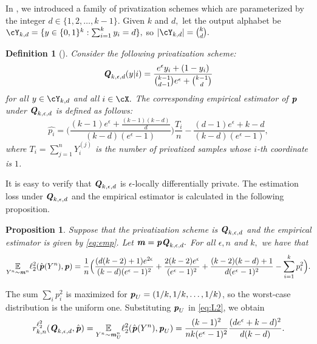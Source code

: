 \documentclass[11pt,onecolumn]{IEEEtran}
\newtheorem{proposition}[theorem]{Proposition}
\newtheorem{definition}[theorem]{Definition}
\def\mathbi#1{{\textbf{\textit #1}}}
\begin{document}
In \cite{Ye17}, we introduced a family of privatization schemes
which are parameterized by the integer $d\in\{1,2,\dots,k-1\}.$ Given $k$ and $d,$ let the output alphabet be 
$\cY_{k,d}=\{y\in \{0,1\}^k: \sum_{i=1}^k y_i=d\},$ so $|\cY_{k,d}|=\binom{k}{d}.$ 

\begin{definition} [\cite{Ye17}] Consider the following privatization scheme:
   \begin{equation}\label{eq:defQ}
\mathbi{Q}_{k,\epsilon,d}(y|i)=\frac{e^\epsilon y_i+(1-y_i)}{\binom{k-1}{d-1}e^{\epsilon}+\binom{k-1}{d}} 
    \end{equation}
for all $y\in\cY_{k,d}$ and all $i\in\cX.$
%
The corresponding empirical estimator of $\mathbi{p}$ under $\mathbi{Q}_{k,\epsilon,d}$ is defined as follows:
\begin{equation}\label{eq:emp}
\hat{p_i}=\Big(\frac{(k-1)e^{\epsilon}+\frac{(k-1)(k-d)}{d}}{(k-d)(e^{\epsilon}-1)}\Big)\frac{T_i}{n}
-\frac{(d-1)e^{\epsilon}+k-d}{(k-d)(e^{\epsilon}-1)},
\end{equation}
where $T_i=\sum_{j=1}^n Y_i^{(j)}$ is the number of privatized samples whose $i$-th coordinate is $1$.
\end{definition}


It is easy to verify that $\mathbi{Q}_{k,\epsilon,d}$ is $\epsilon$-locally differentially private.
The estimation loss under $\mathbi{Q}_{k,\epsilon,d}$ and the empirical estimator is calculated in the following proposition.
\begin{proposition}\label{prop:risks}{\rm\cite[Prop.~III.1]{Ye17}} Suppose that the privatization scheme is 
 $\mathbi{Q}_{k,\epsilon,d}$ and the empirical estimator is given by \eqref{eq:emp}.
Let $\mathbi{m}=\mathbi{p}\mathbi{Q}_{k,\epsilon,d}.$
For all $\epsilon, n$ and $k,$ we have that
    \begin{equation}\label{eq:L2}
    \underset{Y^n\sim \mathbi{m}^n}{\mathbb{E}} \ell_2^2(\hat{\mathbi{p}}(Y^n),\mathbi{p})=\frac{1}{n}
     \Big(\frac{(d(k-2)+1)e^{2\epsilon}}{(k-d)(e^{\epsilon}-1)^2} +\frac{2(k-2)e^{\epsilon}}{(e^{\epsilon}-1)^2}
     +\frac{(k-2)(k-d)+1}{d(e^{\epsilon}-1)^2} -\sum_{i=1}^k p_i^2 \Big).
    \end{equation}
\end{proposition}

The sum $\sum_{i}p_i^2$ is maximized for $\mathbi{p}_U=(1/k,1/k,\dots,1/k)$, so the worst-case distribution is
the uniform one. Substituting $\mathbi{p}_U$ in \eqref{eq:L2}, we obtain
  \begin{equation}\label{eq:rd}
r_{k,n}^{\ell_2^2} (\mathbi{Q}_{k,\epsilon,d}, \hat{\mathbi{p}})  =
\underset{Y^n\sim \mathbi{m}_U^n}{\mathbb{E}} \ell_2^2(\hat{\mathbi{p}}(Y^n),\mathbi{p}_U)=
\frac{(k-1)^2}{nk(e^{\epsilon}-1)^2} \frac{(d e^{\epsilon} + k-d)^2 }{d(k-d)}.
  \end{equation}
\end{document}
